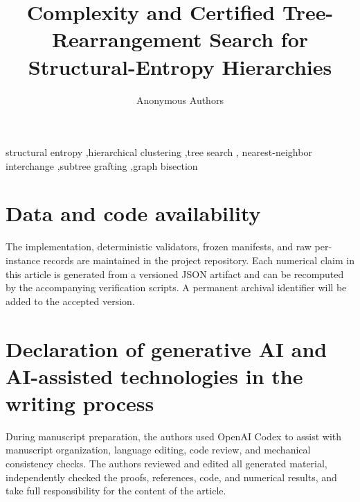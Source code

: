 \documentclass[preprint,12pt]{elsarticle}
\theoremstyle{definition}
\begin{document}
\begin{frontmatter}
\title{Complexity and Certified Tree-Rearrangement Search for
Structural-Entropy Hierarchies}

\author{Anonymous Authors}
\address{Affiliation withheld for review}



\begin{keyword}
structural entropy \sep hierarchical clustering \sep tree search \sep
nearest-neighbor interchange \sep subtree grafting \sep graph bisection
\end{keyword}
\end{frontmatter}











\section*{Data and code availability}
The implementation, deterministic validators, frozen manifests, and raw
per-instance records are maintained in the project repository. Each numerical
claim in this article is generated from a versioned JSON artifact and can be
recomputed by the accompanying verification scripts. A permanent archival
identifier will be added to the accepted version.

\section*{Declaration of generative AI and AI-assisted technologies in the
writing process}
During manuscript preparation, the authors used OpenAI Codex to assist with
manuscript organization, language editing, code review, and mechanical
consistency checks. The authors reviewed and edited all generated material,
independently checked the proofs, references, code, and numerical results, and
take full responsibility for the content of the article.




\appendix

\end{document}
